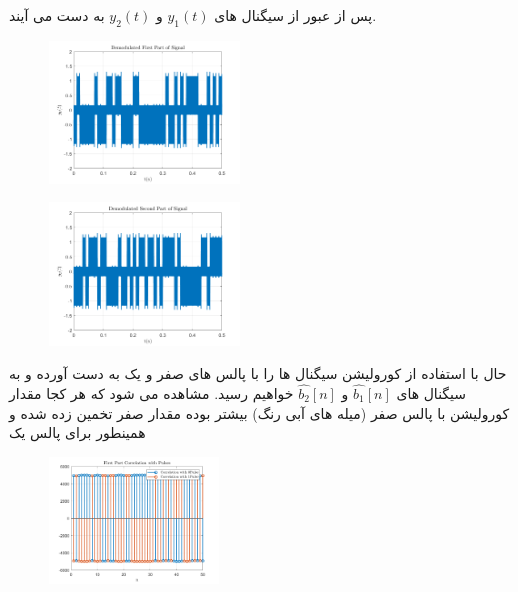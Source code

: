 \documentclass[a4paper]{article}
\begin{document}
	\newpage
	پس از عبور از  سیگنال های 
	$y_1(t)$
	و 
	$y_2(t)$
	به دست می آیند.
	\newline
	\begin{figure}[h!]
		\includegraphics[width=0.45\textwidth]{comsys_fig09.png}\\ 
		\centering
	\end{figure}
	\begin{figure}[h!]
		\includegraphics[width=0.45\textwidth]{comsys_fig10.png}\\ 
		\centering
	\end{figure}
	\newline
	حال با استفاده از  کورولیشن سیگنال ها را با پالس های صفر و یک به دست آورده و به سیگنال های 
	$\hat{b_1}[n]$
	و 
	$\hat{b_2}[n]$
	خواهیم رسید.
	\newline
	مشاهده می شود که هر کجا مقدار کورولیشن با پالس صفر (میله های آبی رنگ) بیشتر بوده مقدار صفر تخمین زده شده و همینطور برای پالس یک
	\newline
	\begin{figure}[h!]
		\includegraphics[width=0.4\textwidth]{comsys_fig11.png}\\ 
		\centering
	\end{figure}
\end{document}
